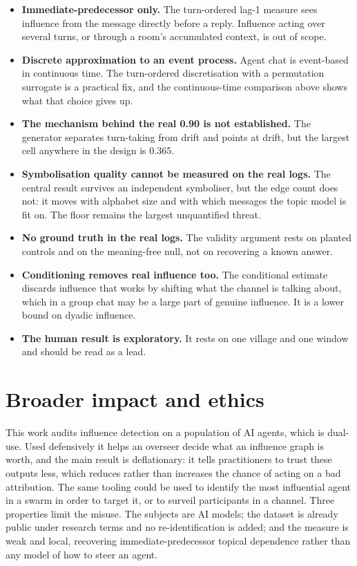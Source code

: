 \documentclass[10pt]{article}
\begin{document}
\begin{itemize}
\item \textbf{Immediate-predecessor only.} The turn-ordered lag-1 measure sees influence from the
message directly before a reply. Influence acting over several turns, or through a room's accumulated
context, is out of scope.
\item \textbf{Discrete approximation to an event process.} Agent chat is event-based in continuous
time. The turn-ordered discretisation with a permutation surrogate is a practical fix, and the
continuous-time comparison above shows what that choice gives up.
\item \textbf{The mechanism behind the real 0.90 is not established.} The generator separates
turn-taking from drift and points at drift, but the largest cell anywhere in the design is 0.365.
\item \textbf{Symbolisation quality cannot be measured on the real logs.} The central result survives
an independent symboliser, but the edge count does not: it moves with alphabet size and with which
messages the topic model is fit on. The floor remains the largest unquantified threat.
\item \textbf{No ground truth in the real logs.} The validity argument rests on planted controls and
on the meaning-free null, not on recovering a known answer.
\item \textbf{Conditioning removes real influence too.} The conditional estimate discards influence
that works by shifting what the channel is talking about, which in a group chat may be a large part
of genuine influence. It is a lower bound on dyadic influence.
\item \textbf{The human result is exploratory.} It rests on one village and one window and should be
read as a lead.
\end{itemize}

\section*{Broader impact and ethics}

This work audits influence detection on a population of AI agents, which is dual-use. Used
defensively it helps an overseer decide what an influence graph is worth, and the main result is
deflationary: it tells practitioners to trust these outputs less, which reduces rather than increases
the chance of acting on a bad attribution. The same tooling could be used to identify the most
influential agent in a swarm in order to target it, or to surveil participants in a channel. Three
properties limit the misuse. The subjects are AI models; the dataset is already public under research
terms and no re-identification is added; and the measure is weak and local, recovering
immediate-predecessor topical dependence rather than any model of how to steer an agent.
\end{document}
